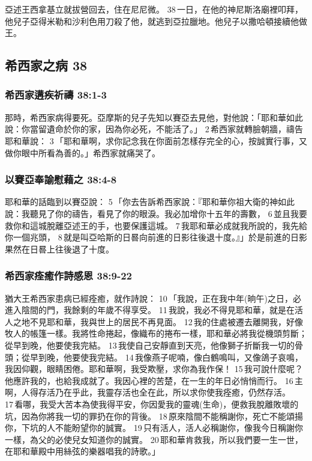 亞述王西拿基立就拔營回去，住在尼尼微。 38 一日，在他的神尼斯洛廟裡叩拜，他兒子亞得米勒和沙利色用刀殺了他，就逃到亞拉臘地。他兒子以撒哈頓接續他做王。

\subsection{希西家之病 38}
\subsubsection{希西家遘疾祈禱 38:1-3}
那時，希西家病得要死。亞摩斯的兒子先知以賽亞去見他，對他說：「耶和華如此說：你當留遺命於你的家，因為你必死，不能活了。」 2 希西家就轉臉朝牆，禱告耶和華說： 3 「耶和華啊，求你記念我在你面前怎樣存完全的心，按誠實行事，又做你眼中所看為善的。」希西家就痛哭了。

\subsubsection{以賽亞奉諭慰藉之 38:4-8}
耶和華的話臨到以賽亞說： 5 「你去告訴希西家說：『耶和華你祖大衛的神如此說：我聽見了你的禱告，看見了你的眼淚。我必加增你十五年的壽數， 6 並且我要救你和這城脫離亞述王的手，也要保護這城。 7 我耶和華必成就我所說的，我先給你一個兆頭， 8 就是叫亞哈斯的日晷向前進的日影往後退十度。』」於是前進的日影果然在日晷上往後退了十度。

\subsubsection{希西家痊癒作詩感恩 38:9-22}
猶大王希西家患病已經痊癒，就作詩說： 10 「我說，正在我中年(晌午)之日，必進入陰間的門，我餘剩的年歲不得享受。 11 我說，我必不得見耶和華，就是在活人之地不見耶和華，我與世上的居民不再見面。 12 我的住處被遷去離開我，好像牧人的帳篷一樣。我將性命捲起，像織布的捲布一樣，耶和華必將我從機頭剪斷；從早到晚，他要使我完結。 13 我使自己安靜直到天亮，他像獅子折斷我一切的骨頭；從早到晚，他要使我完結。 14 我像燕子呢喃，像白鶴鳴叫，又像鴿子哀鳴，我因仰觀，眼睛困倦。耶和華啊，我受欺壓，求你為我作保！ 15 我可說什麼呢？他應許我的，也給我成就了。我因心裡的苦楚，在一生的年日必悄悄而行。 16 主啊，人得存活乃在乎此，我靈存活也全在此，所以求你使我痊癒，仍然存活。 17 看哪，我受大苦本為使我得平安，你因愛我的靈魂(生命)，便救我脫離敗壞的坑，因為你將我一切的罪扔在你的背後。 18 原來陰間不能稱謝你，死亡不能頌揚你，下坑的人不能盼望你的誠實。 19 只有活人，活人必稱謝你，像我今日稱謝你一樣，為父的必使兒女知道你的誠實。 20 耶和華肯救我，所以我們要一生一世，在耶和華殿中用絲弦的樂器唱我的詩歌。」

